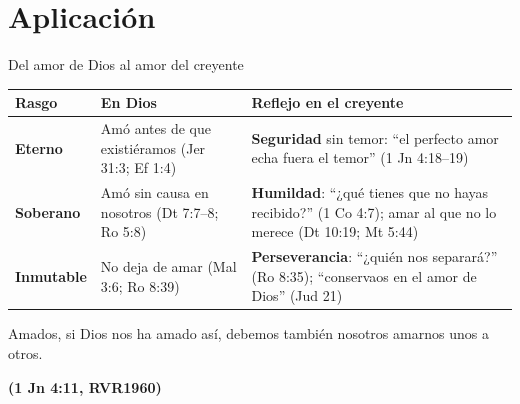 \documentclass[hyperref={bookmarks=false},aspectratio=169]{beamer}
\newcommand{\fuente}[1]{\par\hfill{\upshape\bfseries\footnotesize\textcolor{azul}{#1}}}
\newcommand{\destacar}[1]{\textbf{\textcolor{azul}{#1}}}
\begin{document}
\section{Aplicación}

\begin{frame}{Del amor de Dios al amor del creyente}
\small\renewcommand{\arraystretch}{1.25}
\begin{tabular}{@{}>{\RaggedRight\arraybackslash}p{2.0cm}>{\RaggedRight\arraybackslash}p{4.4cm}>{\RaggedRight\arraybackslash}p{5.4cm}@{}}
\toprule
\textbf{Rasgo} & \textbf{En Dios} & \textbf{Reflejo en el creyente} \\ \midrule
\destacar{Eterno} & Amó antes de que existiéramos (Jer 31:3; Ef 1:4) & \textbf{Seguridad} sin temor: ``el perfecto amor echa fuera el temor'' (1 Jn 4:18--19) \\
\destacar{Soberano} & Amó sin causa en nosotros (Dt 7:7--8; Ro 5:8) & \textbf{Humildad}: ``¿qué tienes que no hayas recibido?'' (1 Co 4:7); amar al que no lo merece (Dt 10:19; Mt 5:44) \\
\destacar{Inmutable} & No deja de amar (Mal 3:6; Ro 8:39) & \textbf{Perseverancia}: ``¿quién nos separará?'' (Ro 8:35); ``conservaos en el amor de Dios'' (Jud 21) \\
\bottomrule
\end{tabular}\par\medskip
\begin{cita}Amados, si Dios nos ha amado así, debemos también nosotros amarnos unos a otros.\fuente{(1 Jn 4:11, RVR1960)}\end{cita}
\end{frame}
\end{document}
